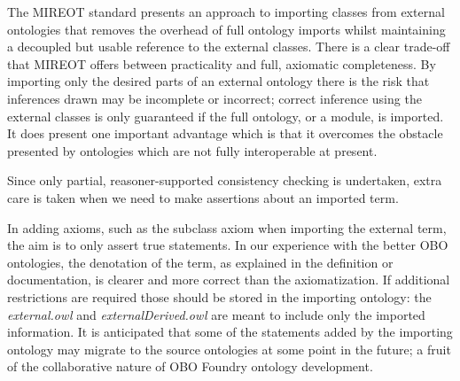\documentclass[jou]{ao2e}%
\begin{document}
The \ac{MIREOT} standard presents an approach to importing classes from external ontologies that removes the overhead of full ontology imports whilst maintaining a decoupled but usable reference to the external classes. There is a clear trade-off that \ac{MIREOT} offers between practicality and full, axiomatic completeness. By importing only the desired parts of an external ontology there is the risk that inferences drawn may be incomplete or incorrect; correct inference using the external classes is only guaranteed if the full ontology, or a module, is imported. It does present one important advantage which is that it overcomes the obstacle presented by ontologies which are not fully interoperable at present.

Since only partial, reasoner-supported consistency checking is undertaken, extra care is taken when we need to make assertions about an imported term. %

In adding axioms, such as the subclass axiom when importing the external term, the aim is to only assert true statements.
In our experience with the better OBO ontologies, the denotation of the term, as explained in the definition or documentation, is clearer and more correct than the axiomatization. %
If additional restrictions are required those should be stored in the importing ontology: the \emph{external.owl} and \emph{externalDerived.owl} are meant to include only the imported information.
It is anticipated that some of the statements added by the importing ontology may migrate to the source ontologies at some point in the future; a fruit of the collaborative nature of OBO Foundry ontology development. %
\end{document}
